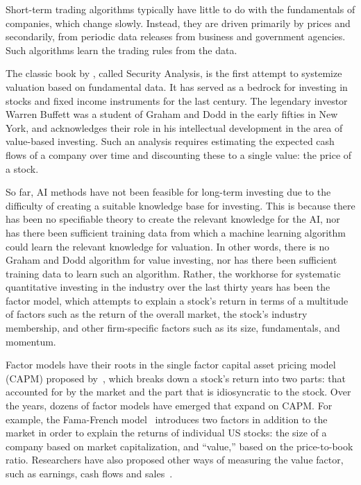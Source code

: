 \documentclass[]{interact}
\theoremstyle{plain}%
\theoremstyle{definition}
\theoremstyle{remark}
\begin{document}
Short-term trading algorithms typically have little to do with the fundamentals of companies, which change slowly. Instead, they are driven primarily by prices and secondarily, from periodic data releases from business and government agencies. Such algorithms learn the trading rules from the data.

The classic book by \citet{graham1934security}, called Security Analysis, is the first attempt to systemize valuation based on fundamental data. It has served as a bedrock for investing in stocks and fixed income instruments for the last century. The legendary investor Warren Buffett was a student of Graham and Dodd in the early fifties in New York, and acknowledges their role in his intellectual development in the area of value-based investing. Such an analysis requires estimating the expected cash flows of a company over time and discounting these to a single value: the price of a stock.

So far, AI methods have not been feasible for long-term investing due to the difficulty of creating a suitable knowledge base for investing. This is because there has been no specifiable theory to create the relevant knowledge for the AI, nor has there been sufficient training data from which a machine learning algorithm could learn the relevant knowledge for valuation. In other words, there is no Graham and Dodd algorithm for value investing, nor has there been sufficient training data to learn such an algorithm. Rather, the workhorse for systematic quantitative investing in the industry over the last thirty years has been the factor model, which attempts to explain a stock's return in terms of a multitude of factors such as the return of the overall market, the stock’s industry membership, and other firm-specific factors such as its size, fundamentals, and momentum.

Factor models have their roots in the single factor capital asset pricing model (CAPM) proposed by~\citet{sharpe1964capital}, which breaks down a stock's return into two parts: that accounted for by the market and the part that is idiosyncratic to the stock. Over the years, dozens of factor models have emerged that expand on CAPM. For example, the Fama-French model~\citep{fama1993common} introduces two factors in addition to the market in order to explain the returns of individual US stocks: the size of a company based on market capitalization, and ``value,'' based on the price-to-book ratio. Researchers have also proposed other ways of measuring the value factor, such as earnings, cash flows and sales~\citep{asness2013devil}.
\end{document}
